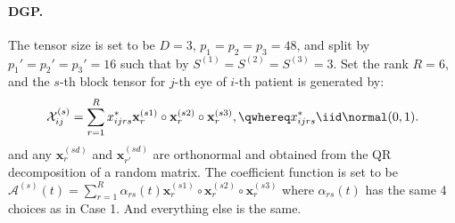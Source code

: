 \documentclass[10pt]{notes}
\begin{document}
\paragraph*{DGP.}
The tensor size is set to be $D=3$, $p_1=p_2=p_3=48$, and split by $p_1'=p_2'=p_3'=16$ such that by $S^{(1)}=S^{(2)}=S^{(3)}=3$. Set the rank $R=6$, and the $s$-th block tensor for $j$-th eye of $i$-th patient is generated by:
\begin{align*}
    \mathcal{X}_{ij}^{(s)}=\sum_{r=1}^{R}x^*_{ijrs}\mathbf{x}_{r}^{(s1)}\circ\mathbf{x}_{r}^{(s2)}\circ\mathbf{x}_{r}^{(s3)},
    \qwhereq
    x_{ijrs}^*\iid \normal(0,1).
\end{align*}
and any $\mathbf{x}_{r}^{(sd)}$ and $\mathbf{x}_{r'}^{(sd)}$ are orthonormal and obtained from the QR decomposition of a random matrix. The coefficient function is set to be $\mathcal{A}^{(s)}(t)=\sum_{r=1}^{R} \alpha_{rs}(t)\mathbf{x}_r^{(s1)}\circ \mathbf{x}_r^{(s2)}\circ\mathbf{x}_{r}^{(s3)}$ where $\alpha_{rs}(t)$ has the same 4 choices as in Case 1. And everything else is the same.

\end{document}
